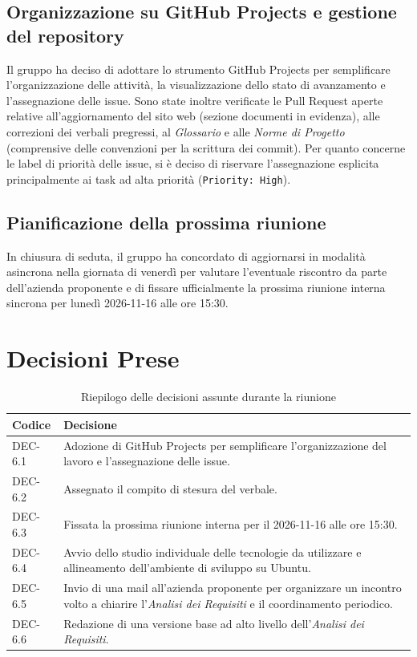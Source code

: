 \documentclass[11pt, a4paper]{article}
\begin{document}
\subsection{Organizzazione su GitHub Projects e gestione del repository}
Il gruppo ha deciso di adottare lo strumento GitHub Projects per semplificare l'organizzazione delle attività, la visualizzazione dello stato di avanzamento e l'assegnazione delle issue.
Sono state inoltre verificate le Pull Request aperte relative all'aggiornamento del sito web (sezione documenti in evidenza), alle correzioni dei verbali pregressi, al \textit{Glossario} e alle \textit{Norme di Progetto} (comprensive delle convenzioni per la scrittura dei commit). Per quanto concerne le label di priorità delle issue, si è deciso di riservare l'assegnazione esplicita principalmente ai task ad alta priorità (\texttt{Priority: High}).

\subsection{Pianificazione della prossima riunione}
In chiusura di seduta, il gruppo ha concordato di aggiornarsi in modalità asincrona nella giornata di venerdì per valutare l'eventuale riscontro da parte dell'azienda proponente e di fissare ufficialmente la prossima riunione interna sincrona per lunedì 2026-11-16 alle ore 15:30.


\clearpage
\section{Decisioni Prese}

\begin{table}[htbp]
\centering
\caption{Riepilogo delle decisioni assunte durante la riunione}
\label{tab:decisioni}
\begin{tabularx}{\textwidth}{l X}
\toprule
\textbf{Codice} & \textbf{Decisione} \\
\midrule
DEC-6.1 & Adozione di GitHub Projects per semplificare l'organizzazione del lavoro e l'assegnazione delle issue. \\
DEC-6.2 & Assegnato il compito di stesura del verbale. \\
DEC-6.3 & Fissata la prossima riunione interna per il 2026-11-16 alle ore 15:30. \\
DEC-6.4 & Avvio dello studio individuale delle tecnologie da utilizzare e allineamento dell'ambiente di sviluppo su Ubuntu. \\
DEC-6.5 & Invio di una mail all'azienda proponente per organizzare un incontro volto a chiarire l'\textit{Analisi dei Requisiti} e il coordinamento periodico. \\
DEC-6.6 & Redazione di una versione base ad alto livello dell'\textit{Analisi dei Requisiti}. \\
\bottomrule
\end{tabularx}
\end{table}
\end{document}

